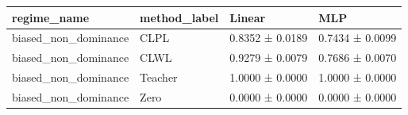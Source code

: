 \begin{tabular}{llll}
\toprule
regime_name & method_label & Linear & MLP \\
\midrule
biased_non_dominance & CLPL & 0.8352 ± 0.0189 & 0.7434 ± 0.0099 \\
biased_non_dominance & CLWL & 0.9279 ± 0.0079 & 0.7686 ± 0.0070 \\
biased_non_dominance & Teacher & 1.0000 ± 0.0000 & 1.0000 ± 0.0000 \\
biased_non_dominance & Zero & 0.0000 ± 0.0000 & 0.0000 ± 0.0000 \\
\bottomrule
\end{tabular}

